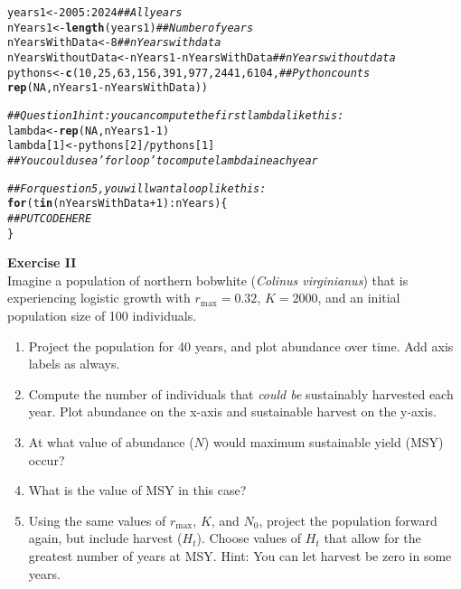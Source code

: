 \documentclass[12pt]{article}\usepackage[]{graphicx}\usepackage[]{color}
\makeatletter
\newcommand{\hlnum}[1]{\textcolor[rgb]{0.686,0.059,0.569}{#1}}%
\newcommand{\hlcom}[1]{\textcolor[rgb]{0.678,0.584,0.686}{\textit{#1}}}%
\newcommand{\hlopt}[1]{\textcolor[rgb]{0,0,0}{#1}}%
\newcommand{\hlstd}[1]{\textcolor[rgb]{0.345,0.345,0.345}{#1}}%
\newcommand{\hlkwa}[1]{\textcolor[rgb]{0.161,0.373,0.58}{\textbf{#1}}}%
\newcommand{\hlkwb}[1]{\textcolor[rgb]{0.69,0.353,0.396}{#1}}%
\newcommand{\hlkwd}[1]{\textcolor[rgb]{0.737,0.353,0.396}{\textbf{#1}}}%
\newenvironment{kframe}{%
 \def\at@end@of@kframe{}%
 \ifinner\ifhmode%
  \def\at@end@of@kframe{\end{minipage}}%
  \begin{minipage}{\columnwidth}%
 \fi\fi%
 \def\FrameCommand##1{\hskip\@totalleftmargin \hskip-\fboxsep
 \colorbox{shadecolor}{##1}\hskip-\fboxsep
     \hskip-\linewidth \hskip-\@totalleftmargin \hskip\columnwidth}%
 \MakeFramed {\advance\hsize-\width
   \@totalleftmargin\z@ \linewidth\hsize
   \@setminipage}}%
 {\par\unskip\endMakeFramed%
 \at@end@of@kframe}
\newenvironment{knitrout}{}{} %
\makeatother
\begin{document}
\begin{knitrout}
\color{fgcolor}\begin{kframe}
\begin{alltt}
\hlstd{years1} \hlkwb{<-} \hlnum{2005}\hlopt{:}\hlnum{2024}                                  \hlcom{## All years}
\hlstd{nYears1} \hlkwb{<-} \hlkwd{length}\hlstd{(years1)}                            \hlcom{## Number of years}
\hlstd{nYearsWithData} \hlkwb{<-} \hlnum{8}                                  \hlcom{## nYears with data}
\hlstd{nYearsWithoutData} \hlkwb{<-} \hlstd{nYears1}\hlopt{-}\hlstd{nYearsWithData}          \hlcom{## nYears without data}
\hlstd{pythons} \hlkwb{<-} \hlkwd{c}\hlstd{(}\hlnum{10}\hlstd{,} \hlnum{25}\hlstd{,} \hlnum{63}\hlstd{,} \hlnum{156}\hlstd{,} \hlnum{391}\hlstd{,} \hlnum{977}\hlstd{,} \hlnum{2441}\hlstd{,} \hlnum{6104}\hlstd{,}  \hlcom{## Python counts}
             \hlkwd{rep}\hlstd{(}\hlnum{NA}\hlstd{, nYears1}\hlopt{-}\hlstd{nYearsWithData))}

\hlcom{## Question 1 hint: you can compute the first lambda like this:}
\hlstd{lambda} \hlkwb{<-} \hlkwd{rep}\hlstd{(}\hlnum{NA}\hlstd{, nYears1}\hlopt{-}\hlnum{1}\hlstd{)}
\hlstd{lambda[}\hlnum{1}\hlstd{]} \hlkwb{<-} \hlstd{pythons[}\hlnum{2}\hlstd{]}\hlopt{/}\hlstd{pythons[}\hlnum{1}\hlstd{]}
\hlcom{## You could use a 'for loop' to compute lambda in each year}

\hlcom{## For question 5, you will want a loop like this:}
\hlkwa{for}\hlstd{(t} \hlkwa{in} \hlstd{(nYearsWithData}\hlopt{+}\hlnum{1}\hlstd{)}\hlopt{:}\hlstd{nYears) \{}
   \hlcom{## PUT CODE HERE}
\hlstd{\}}
\end{alltt}
\end{kframe}
\end{knitrout}



\clearpage



{\bf Exercise II \\}
Imagine a population of northern bobwhite ({\it Colinus virginianus})
that is experiencing logistic growth with $r_\mathrm{max} = 0.32$, $K = 2000$,
and an initial population size of 100 individuals.
\begin{enumerate}
  \item Project the population for 40 years, and plot abundance over
    time. Add axis labels as always.
  \item Compute the number of individuals that {\it could be} sustainably
    harvested each year. Plot abundance on the x-axis and sustainable
    harvest on the y-axis.
  \item At what value of abundance ($N$) would maximum sustainable yield (MSY) occur?
  \item What is the value of MSY in this case? %
  \item Using the same values of $r_\mathrm{max}$, $K$, and $N_0$, project the population
    forward again, but include harvest ($H_t$). Choose values of $H_t$ that
    allow for the greatest number of years at MSY. Hint: You can let
    harvest be zero in some years.
\end{enumerate}
\end{document}
